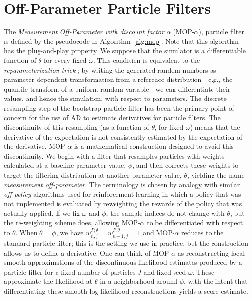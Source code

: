 \documentclass[numsec,webpdf,modern,medium,namedate]{oup-authoring-template}
\begin{document}
\section{Off-Parameter Particle Filters}

The {\it Measurement Off-Parameter with discount factor} $\alpha$ (MOP-$\alpha$), particle filter is defined by the pseudocode in Algorithm~\ref{alg:mop}.
Note that this algorithm has the plug-and-play property.
We suppose that the simulator is a differentiable function of $\theta$ for every fixed $\omega$.
This condition is equivalent to the {\it reparameterization trick} \citep{corenflos21}; by writing the generated random numbers as parameter-dependent transformation from a reference distribution---e.g., the quantile transform of a uniform random variable---we can differentiate their values, and hence the simulation, with respect to parameters.
The discrete resampling step of the bootstrap particle filter has been the primary point of concern for the use of AD to estimate derivatives for particle filters.
The discontinuity of this resampling (as a function of $\theta$, for fixed $\omega$) means that the derivative of the expectation is not consistently estimated by the expectation of the derivative. 
MOP-$\alpha$ is a mathematical construction designed to avoid this discontinuity.
We begin with a filter that resamples particles with weights calculated at a baseline parameter value, $\phi$, and then corrects these weights to target the filtering distribution at another parameter value, $\theta$, yielding the name {\it measurement off-parameter}.
The terminology is chosen by analogy with similar {\it off-policy} algorithms used for reinforcement learning in which a policy that was not implemented is evaluated by reweighting the rewards of the policy that was actually applied.
If we fix $\omega$ and $\phi$, the sample indices do not change with $\theta$, but the re-weighting scheme does, allowing MOP-$\alpha$ to be differentiated with respect to $\theta$.
When $\theta = \phi$, we have $w_{n,j}^{P,\theta} = w_{n-1,j}^{F,\theta} = 1$ and MOP-$\alpha$ reduces  to the standard particle filter; this is the setting we use in practice,  but the construction allows us to define a derivative.
One can think of MOP-$\alpha$ as reconstructing local smooth approximations of the discontinuous likelihood estimates produced by a particle filter for a fixed number of particles $J$ and fixed seed $\omega$.
These approximate the likelihood at $\theta$ in a neighborhood around $\phi$, with the intent that differentiating these smooth log-likelihood reconstructions yields a score estimate.
\end{document}

